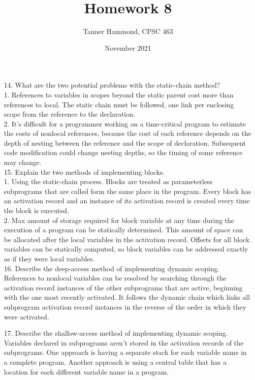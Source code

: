 \documentclass{article}
\title{Homework 8}
\author{Tanner Hammond, CPSC 463}
\date{November 2021}
\begin{document}
\maketitle

14. What are the two potential problems with the static-chain method? \\

1. References to variables in scopes beyond the static parent cost more than references to local. The static chain must be followed, one link per enclosing scope from the reference to the declaration. \\
2. It's difficult for a programmer working on a time-critical program to estimate the costs of nonlocal references, because the cost of each reference depends on the depth of nesting between the reference and the scope of declaration. Subsequent code modification could change nesting depths, so the timing of some reference may change.\\

15. Explain the two methods of implementing blocks. \\

1. Using the static-chain process. Blocks are treated as parameterless subprograms that are called form the same place in the program. Every block has an activation record and an instance of its activation record is created every time the block is executed. \\
2. Max amount of storage required for block variable at any time during the execution of a program can be statically determined. This amount of space can be allocated after the local variables in the activation record. Offsets for all block variables can be statically computed, so block variables can be addressed exactly as if they were local variables.\\

16. Describe the deep-access method of implementing dynamic scoping. \\

References to nonlocal variables can be resolved by searching through the activation record instances of the other subprograms that are active, beginning with the one most recently activated. It follows the dynamic chain which links all subprogram activation record instances in the reverse of the order in which they were activated.

17. Describe the shallow-access method of implementing dynamic scoping. \\

Variables declared in subprograms aren't stored in the activation records of the subprograms. One approach is having a separate stack for each variable name in a complete program. Another approach is using a central table that has a location for each different variable name in a program.\\
\end{document}
